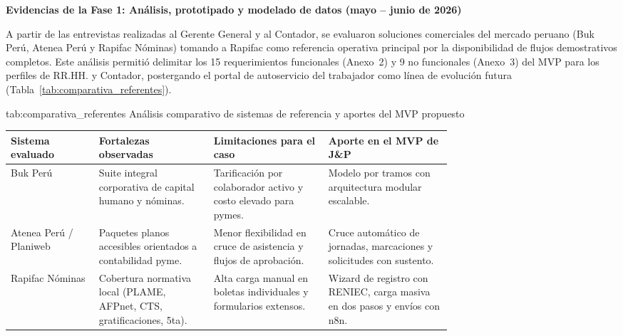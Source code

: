 \par\medskip
\noindent\textbf{Evidencias de la Fase 1: Análisis, prototipado y modelado de datos (mayo – junio de 2026)}
\par\nobreak
A partir de las entrevistas realizadas al Gerente General y al Contador, 
se evaluaron soluciones comerciales del mercado peruano (Buk Perú, Atenea Perú y Rapifac Nóminas) 
tomando a Rapifac como referencia operativa principal por la disponibilidad de flujos demostrativos completos. 
Este análisis permitió delimitar los 15 requerimientos funcionales (Anexo~2) y 9 no funcionales (Anexo~3) del MVP para los perfiles de RR.HH. y Contador, 
postergando el portal de autoservicio del trabajador como línea de evolución futura (Tabla~\ref{tab:comparativa_referentes}).

\par
\noindent
\begin{minipage}{\linewidth}

    \tituloTablaAPA
        {tab:comparativa_referentes}
        {Análisis comparativo de sistemas de referencia y aportes del MVP propuesto}

    \begingroup
    \renewcommand{\baselinestretch}{1}
    \footnotesize
    \setlength{\tabcolsep}{4pt}
    \renewcommand{\arraystretch}{1.35}

    \begin{tabularx}{\linewidth}{
        @{}
        >{\raggedright\arraybackslash}p{0.20\linewidth}
        >{\raggedright\arraybackslash}p{0.26\linewidth}
        >{\raggedright\arraybackslash}p{0.26\linewidth}
        >{\raggedright\arraybackslash}X
        @{}
    }
        \toprule
        \textbf{Sistema evaluado} &
        \textbf{Fortalezas observadas} &
        \textbf{Limitaciones para el caso} &
        \textbf{Aporte en el MVP de J\&P} \\
        \midrule

        Buk Perú &
        Suite integral corporativa de capital humano y nóminas. &
        Tarificación por colaborador activo y costo elevado para pymes. &
        Modelo por tramos con arquitectura modular escalable. \\

        Atenea Perú / Planiweb &
        Paquetes planos accesibles orientados a contabilidad pyme. &
        Menor flexibilidad en cruce de asistencia y flujos de aprobación. &
        Cruce automático de jornadas, marcaciones y solicitudes con sustento. \\

        Rapifac Nóminas &
        Cobertura normativa local (PLAME, AFPnet, CTS, gratificaciones, 5ta). &
        Alta carga manual en boletas individuales y formularios extensos. &
        Wizard de registro con RENIEC, carga masiva en dos pasos y envíos con n8n. \\

        \bottomrule
    \end{tabularx}
    \endgroup


\end{minipage}
\finBloqueAPA

